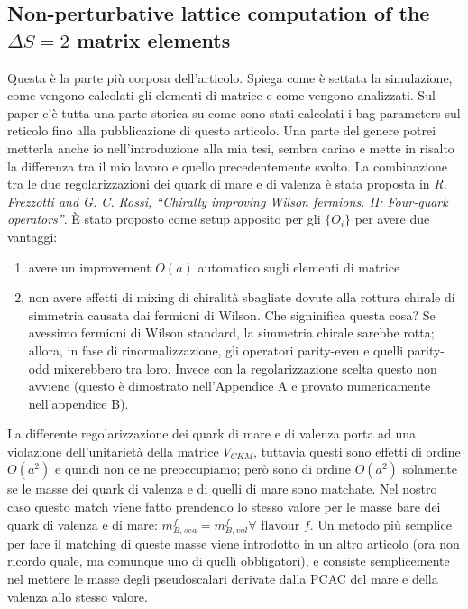 \documentclass[12pt,a4paper,openright]{article}
\newcommand{\colg}{\textcolor{PineGreen}}
\newcommand{\colr}{\textcolor{BrickRed}}
\begin{document}
\subsection{Non-perturbative lattice computation of the $\Delta S = 2$ matrix elements}
Questa è la parte più corposa dell'articolo.
Spiega come è settata la simulazione, come vengono calcolati gli elementi di matrice e come vengono analizzati.
Sul paper c'è tutta una parte storica su come sono stati calcolati i bag parameters sul reticolo fino alla pubblicazione di questo articolo.
\colg{Una parte del genere potrei metterla anche io nell'introduzione alla mia tesi, sembra carino e mette in risalto la differenza tra il mio lavoro e quello precedentemente svolto}.
\newline
La combinazione tra le due regolarizzazioni dei quark di mare e di valenza è stata proposta in \textit{R. Frezzotti and G. C. Rossi, “Chirally improving Wilson fermions. II: Four-quark operators”}.
È stato proposto come setup apposito per gli $\{O_i\}$ per avere due vantaggi:
\begin{enumerate}
  \item \colg{avere un improvement $O(a)$ automatico sugli elementi di matrice}
  \item \colg{non avere effetti di mixing di chiralità sbagliate dovute alla rottura chirale di simmetria causata dai fermioni di Wilson}.
        Che signinifica questa cosa? Se avessimo fermioni di Wilson standard, la simmetria chirale sarebbe rotta; allora, in fase di rinormalizzazione, gli operatori parity-even e quelli parity-odd mixerebbero tra loro.
        Invece con la regolarizzazione scelta questo non avviene (questo è dimostrato nell'Appendice A e provato numericamente nell'appendice B). 
\end{enumerate}
La differente regolarizzazione dei quark di mare e di valenza porta ad una violazione dell'unitarietà della matrice $V_{CKM}$, tuttavia questi sono effetti di ordine $O(a^2)$ e quindi non ce ne preoccupiamo;
però sono di ordine $O(a^2)$ solamente se \colg{le masse dei quark di valenza e di quelli di mare sono matchate}.
Nel nostro caso questo match viene fatto prendendo lo stesso valore per le masse bare dei quark di valenza e di mare: $m_{B,sea}^f = m_{B,val}^f \forall \text{ flavour } f$.
\colr{Un metodo più semplice per fare il matching di queste masse viene introdotto in un altro articolo (ora non ricordo quale, ma comunque uno di quelli obbligatori), e consiste semplicemente nel mettere le masse degli pseudoscalari derivate dalla PCAC del mare e della valenza allo stesso valore}.
\end{document}
